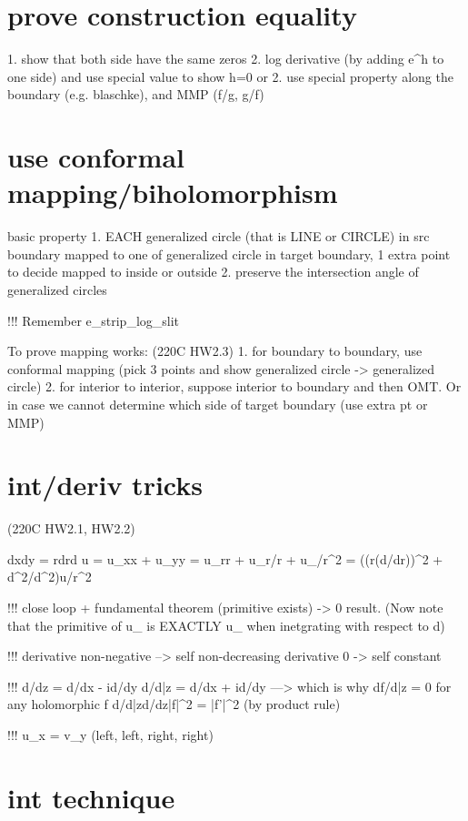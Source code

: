 \section*{prove construction equality}
1. show that both side have the same zeros
2. log derivative (by adding e^h to one side) and use special value to show h=0
or
2. use special property along the boundary (e.g. blaschke), and MMP (f/g, g/f)

\section*{use conformal mapping/biholomorphism}
basic property
1. EACH generalized circle (that is LINE or CIRCLE) in src boundary mapped to one of generalized circle in target boundary, 1 extra point to decide mapped to inside or outside
2. preserve the intersection angle of generalized circles



!!! Remember e_strip_log_slit

To prove mapping works:		(220C HW2.3)
	1. for boundary to boundary, use conformal mapping (pick 3 points and show generalized circle -> generalized circle)
	2. for interior to interior, suppose interior to boundary and then OMT. Or in case we cannot determine which side of target boundary (use extra pt or MMP)


\section*{int/deriv tricks}
(220C HW2.1, HW2.2)

dxdy = rdrd\theta
\Delta u 
= u_{xx} + u_{yy} 
= u_{rr} + u_r/r + u_{\theta\theta}/r^2
= ((r(d/dr))^2 + d^2/d\theta^2)u/r^2

!!! close loop + fundamental theorem (primitive exists) -> 0 result. (Now note that the primitive of u_{\theta\theta} is EXACTLY u_{\theta} when inetgrating with respect to d\theta)


!!! derivative non-negative --> self non-decreasing
derivative 0 -> self constant

!!! d/dz = d/dx - id/dy
d/d\bar{z} = d/dx + id/dy ---> which is why df/d\bar{z} = 0 for any holomorphic f
d/d\bar{z}d/dz|f|^2 = |f'|^2 (by product rule)


!!! u_x = v_y (left, left, right, right)

\section*{int technique}


